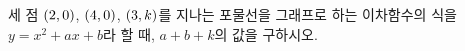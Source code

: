 \hspace*{2mm}\begin{minipage}[t]{\dimexpr\linewidth-2mm\relax}\vspace{0pt}
세 점 $(2{,}\mkern3mu 0)$, $(4{,}\mkern3mu 0)$, $(3{,}\mkern3mu k)$를 지나는 포물선을 그래프로 하는 이차함수의 식을 $y=x^2+ax+b$라 할 때, $a+b+k$의 값을 구하시오. \end{minipage}
